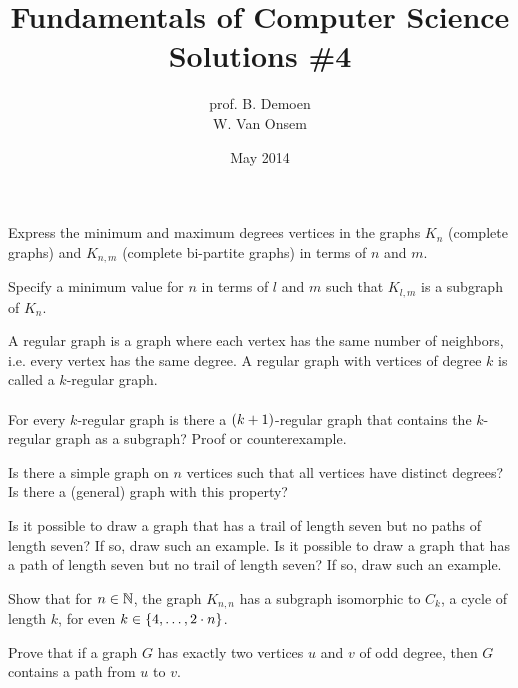 \documentclass{article}
\title{Fundamentals of Computer Science\\Solutions \#4}
\author{prof. B. Demoen\\W. Van Onsem}
\date{May 2014}
\begin{document}
\maketitle
\begin{exercise}
Express the minimum and maximum degrees vertices in the graphs $K_n$ (complete graphs) and $K_{n,m}$ (complete bi-partite graphs) in terms of $n$ and $m$.
\end{exercise}

\begin{exercise}
Specify a minimum value for $n$ in terms of $l$ and $m$ such that $K_{l,m}$ is a subgraph of $K_n$.
\end{exercise}

\begin{exercise}
A regular graph is a graph where each vertex has the same number of neighbors, i.e. every vertex has the same degree. A regular graph with vertices of degree $k$ is called a $k$-regular graph.
\paragraph{}
For every $k$-regular graph is there a $\left( k+1 \right)$-regular graph that contains the $k$-regular graph as a subgraph? Proof or counterexample.
\end{exercise}

\begin{exercise}
Is there a simple graph on $n$ vertices such that all vertices have distinct degrees? Is there a (general) graph with this property?
\end{exercise}

\begin{exercise}
Is it possible to draw a graph that has a trail of length seven but no paths of length seven? If so, draw such an example. Is it possible to draw a graph that has a path of length seven but no trail of length seven? If so, draw such an example.
\end{exercise}

\begin{exercise}
Show that for $n\in\mathbb{N}$, the graph $K_{n,n}$ has a subgraph isomorphic to $C_k$, a cycle of length $k$, for even $k\in\left\{ 4,\ldots,2\cdot n \right\}$.
\end{exercise}

\begin{exercise}
Prove that if a graph $G$ has exactly two vertices $u$ and $v$ of odd degree, then $G$ contains a path from $u$ to $v$.
\end{exercise}
\end{document}
